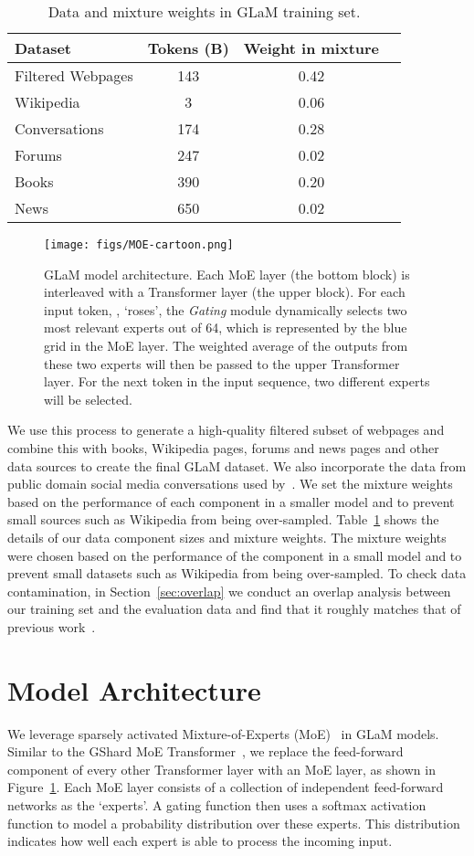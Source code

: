 \documentclass{article}
\newcommand{\glam}{GLaM\xspace}
\begin{document}
\begin{table}[htb]
\centering
\small
\caption{Data and mixture weights in GLaM training set.}
\vskip 0.1in
\label{tab:data}
\begin{tabular}{lccc}
\toprule
Dataset & Tokens (B) & Weight in mixture \\
\midrule
Filtered Webpages & 143 & 0.42 \\
Wikipedia & 3 & 0.06\\
Conversations  & 174 & 0.28 \\
Forums & 247 & 0.02 \\
Books & 390 & 0.20 \\
News & 650 & 0.02 \\
\bottomrule
\end{tabular}
\end{table}
 
\begin{figure}[th]
    \centering
    \texttt{[image: figs/MOE-cartoon.png]}
    \caption{\glam model architecture. Each MoE layer (the bottom block) is interleaved with a Transformer layer (the upper block). For each input token, \eg, `roses', the \textit{Gating} module dynamically selects two most relevant experts out of 64, which is represented by the blue grid in the MoE layer. The weighted average of the outputs from these two experts will then be passed to the upper Transformer layer. For the next token in the input sequence, two different experts will be selected.}
    \label{fig:model}
\end{figure}
We use this process to generate a high-quality filtered subset of webpages and combine this with books, Wikipedia pages, forums and news pages and other data sources to create the final GLaM dataset. We also incorporate the data from public domain social media conversations used by~\citet{meena2020}. We set the mixture weights based on the performance of each component in a smaller model and to prevent small sources such as Wikipedia from being over-sampled. Table~\ref{tab:data} shows the details of our data component sizes and mixture weights. The mixture weights were chosen based on the performance of the component in a small model and to prevent small datasets such as Wikipedia from being over-sampled.
To check data contamination, in Section~\ref{sec:overlap} we conduct an overlap analysis between our training set and the evaluation data and find that it roughly matches that of previous work~\cite{NEURIPS2020_gpt3}.
\section{Model Architecture}
\label{sec:model}
We leverage sparsely activated Mixture-of-Experts (MoE)~\cite{shazeer2017outrageously, fedus2021switch} in \glam models. Similar to the GShard MoE Transformer~\cite{lepikhin2020gshard}, we replace the feed-forward component of every other Transformer layer with an MoE layer, as shown in Figure~\ref{fig:model}. Each MoE layer consists of a collection of independent feed-forward networks as the `experts'. A gating function then uses a softmax activation function to model a probability distribution over these experts. This distribution indicates how well each expert is able to process the incoming input. 
\end{document}
